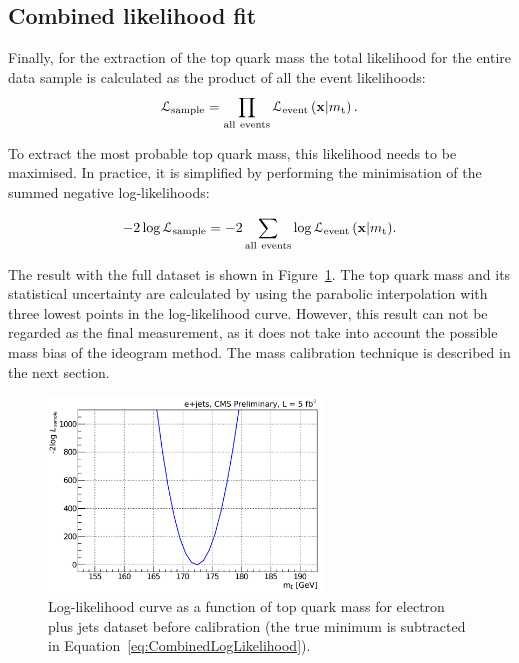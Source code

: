 \subsection{Combined likelihood fit}
\label{ss_top_mass:likelihood_fit}

Finally, for the extraction of the top quark mass the total likelihood for the entire data sample is calculated as the
product of all the event likelihoods:
\begin{equation}
\mathcal{L}_{\rm sample} = \prod_{\rm all~events}
\mathcal{L}_\textrm{event} \left(\mathbf{x}|m_\mathrm{t} \right).
\label{eq:CombinedLikelihood}
\end{equation}

To extract the most probable top quark mass, this likelihood needs to be maximised. In practice, it is simplified by
performing the minimisation of the summed negative log-likelihoods:

\begin{equation}
 -2\log{\mathcal{L}_{\rm sample}} = -2 \sum_{\rm all~events} \log{\mathcal{L}_\textrm{event} \left(\mathbf{x}|\mtop
 \right)}.
\label{eq:CombinedLogLikelihood}
\end{equation}

The result with the full dataset is shown in Figure~\ref{fig:LogLikelihood}. The top quark mass and its statistical
uncertainty are calculated by using the parabolic interpolation with three lowest points in the log-likelihood curve.
However, this result can not be regarded as the final measurement, as it does not take into account the possible mass
bias of the ideogram method. The mass calibration technique is described in the next section.

\begin{figure}[!htpb]
	\centering
	\includegraphics[width=0.65\textwidth]{Likelihood}
	\caption[Log-likelihood curve as a function of top quark mass]{Log-likelihood curve as a function of top quark mass
	for electron plus jets dataset before calibration (the true minimum is subtracted in
	Equation~\ref{eq:CombinedLogLikelihood}).}
	\label{fig:LogLikelihood}
\end{figure}

